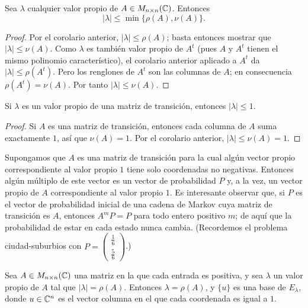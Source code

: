 \documentclass[12pt,a4paper]{book}
\begin{document}
    \begin{corolario}
        Sea $\lambda$ cualquier valor propio de $A\in M_{n\times n}(\mathbb{C})$. Entonces
        \begin{equation*}
            |\lambda|\leq\min\{\rho(A),\nu(A)\}.
        \end{equation*}
    \end{corolario}

    \begin{proof}
        Por el corolario anterior, $|\lambda|\leq\rho(A)$; basta entonces mostrar que $|\lambda|\leq\nu(A)$. Como $\lambda$ es también valor propio de $A^t$ (pues $A$ y $A^t$ tienen el mismo polinomio característico), el corolario anterior aplicado a $A^t$ da $|\lambda|\leq\rho(A^t)$. Pero los renglones de $A^t$ son las columnas de $A$; en consecuencia $\rho(A^t)=\nu(A)$. Por tanto $|\lambda|\leq\nu(A)$.
    \end{proof}

    \begin{corolario}
        Si $\lambda$ es un valor propio de una matriz de transición, entonces $|\lambda|\leq 1$.
    \end{corolario}

    \begin{proof}
        Si $A$ es una matriz de transición, entonces cada columna de $A$ suma exactamente $1$, así que $\nu(A)=1$. Por el corolario anterior, $|\lambda|\leq\nu(A)=1$.
    \end{proof}

    Supongamos que $A$ es una matriz de transición para la cual algún vector propio correspondiente al valor propio $1$ tiene solo coordenadas no negativas. Entonces algún múltiplo de este vector es un vector de probabilidad $P$ y, a la vez, un vector propio de $A$ correspondiente al valor propio $1$. Es interesante observar que, si $P$ es el vector de probabilidad inicial de una cadena de Markov cuya matriz de transición es $A$, entonces $A^mP=P$ para todo entero positivo $m$; de aquí que la probabilidad de estar en cada estado nunca cambia. (Recordemos el problema ciudad-suburbios con $P=\left(\begin{smallmatrix}\frac16\\\frac56\end{smallmatrix}\right)$.)

    \begin{teorema}
        Sea $A\in M_{n\times n}(\mathbb{C})$ una matriz en la que cada entrada es positiva, y sea $\lambda$ un valor propio de $A$ tal que $|\lambda|=\rho(A)$. Entonces $\lambda=\rho(A)$, y $\{u\}$ es una base de $E_\lambda$, donde $u\in\mathbb{C}^n$ es el vector columna en el que cada coordenada es igual a $1$.
    \end{teorema}
\end{document}
